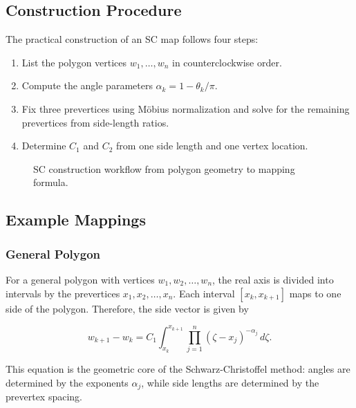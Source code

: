 \documentclass[12pt,a4paper]{article}
\begin{document}
\subsection{Construction Procedure}

The practical construction of an SC map follows four steps:
\begin{enumerate}
\item List the polygon vertices \(w_1,\ldots,w_n\) in counterclockwise order.
\item Compute the angle parameters \(\alpha_k=1-\theta_k/\pi\).
\item Fix three prevertices using Möbius normalization and solve for the remaining prevertices from side-length ratios.
\item Determine \(C_1\) and \(C_2\) from one side length and one vertex location.
\end{enumerate}

\begin{figure}[H]
\centering
{}
\caption{SC construction workflow from polygon geometry to mapping formula.}
\end{figure}

\subsection{Example Mappings}

\subsubsection{General Polygon}

For a general polygon with vertices \(w_1,w_2,\ldots,w_n\), the real axis is divided into intervals by the prevertices \(x_1,x_2,\ldots,x_n\). Each interval \([x_k,x_{k+1}]\) maps to one side of the polygon. Therefore, the side vector is given by
\begin{formulabox}
\[
w_{k+1}-w_k
=C_1\int_{x_k}^{x_{k+1}}
\prod_{j=1}^{n}(\zeta-x_j)^{-\alpha_j}\,d\zeta .
\]
\end{formulabox}
This equation is the geometric core of the Schwarz-Christoffel method: angles are determined by the exponents \(\alpha_j\), while side lengths are determined by the prevertex spacing.
\end{document}
